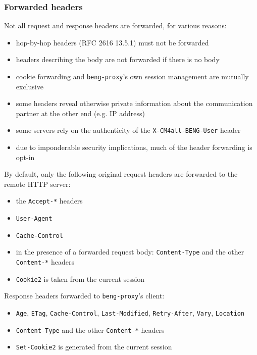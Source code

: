 \documentclass[a4paper,12pt]{article}
\begin{document}
\subsubsection{Forwarded headers}

Not all request and response headers are forwarded, for various
reasons:

\begin{itemize}
\item hop-by-hop headers (RFC 2616 13.5.1) must not be forwarded
\item headers describing the body are not forwarded if there is no
  body
\item cookie forwarding and \texttt{beng-proxy}'s own session
  management are mutually exclusive
\item some headers reveal otherwise private information about the
  communication partner at the other end (e.g. IP address)
\item some servers rely on the authenticity of the
  \texttt{X-CM4all-BENG-User} header
\item due to imponderable security implications, much of the header
  forwarding is opt-in
\end{itemize}

By default, only the following original request headers are forwarded
to the remote HTTP server:

\begin{itemize}
\item the \texttt{Accept-*} headers
\item \texttt{User-Agent}
\item \texttt{Cache-Control}
\item in the presence of a forwarded request body:
  \texttt{Content-Type} and the other \texttt{Content-*} headers
\item \texttt{Cookie2} is taken from the current session
\end{itemize}

Response headers forwarded to \texttt{beng-proxy}'s client:

\begin{itemize}
\item \texttt{Age}, \texttt{ETag}, \texttt{Cache-Control},
  \texttt{Last-Modified}, \texttt{Retry-After}, \texttt{Vary},
  \texttt{Location}
\item \texttt{Content-Type} and the other \texttt{Content-*} headers
\item \texttt{Set-Cookie2} is generated from the current session
\end{itemize}
\end{document}
